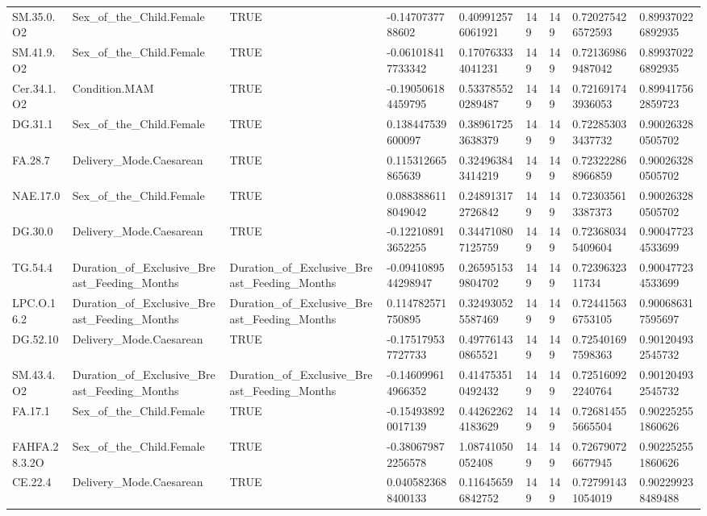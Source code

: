\begin{longtable}{lllllllll}
SM.35.0.O2 & Sex\_of\_the\_Child.Female & TRUE & -0.1470737788602 & 0.409912576061921 & 149 & 149 & 0.720275426572593 & 0.899370226892935 \\
SM.41.9.O2 & Sex\_of\_the\_Child.Female & TRUE & -0.061018417733342 & 0.170763334041231 & 149 & 149 & 0.721369869487042 & 0.899370226892935 \\
Cer.34.1.O2 & Condition.MAM & TRUE & -0.190506184459795 & 0.533785520289487 & 149 & 149 & 0.721691743936053 & 0.899417562859723 \\
DG.31.1 & Sex\_of\_the\_Child.Female & TRUE & 0.138447539600097 & 0.389617253638379 & 149 & 149 & 0.722853033437732 & 0.900263280505702 \\
FA.28.7 & Delivery\_Mode.Caesarean & TRUE & 0.115312665865639 & 0.324963843414219 & 149 & 149 & 0.723222868966859 & 0.900263280505702 \\
NAE.17.0 & Sex\_of\_the\_Child.Female & TRUE & 0.0883886118049042 & 0.248913172726842 & 149 & 149 & 0.723035613387373 & 0.900263280505702 \\
DG.30.0 & Delivery\_Mode.Caesarean & TRUE & -0.122108913652255 & 0.344710807125759 & 149 & 149 & 0.723680345409604 & 0.900477234533699 \\
TG.54.4 & Duration\_of\_Exclusive\_Breast\_Feeding\_Months & Duration\_of\_Exclusive\_Breast\_Feeding\_Months & -0.0941089544298947 & 0.265951539804702 & 149 & 149 & 0.7239632311734 & 0.900477234533699 \\
LPC.O.16.2 & Duration\_of\_Exclusive\_Breast\_Feeding\_Months & Duration\_of\_Exclusive\_Breast\_Feeding\_Months & 0.114782571750895 & 0.324930525587469 & 149 & 149 & 0.724415636753105 & 0.900686317595697 \\
DG.52.10 & Delivery\_Mode.Caesarean & TRUE & -0.175179537727733 & 0.497761430865521 & 149 & 149 & 0.725401697598363 & 0.901204932545732 \\
SM.43.4.O2 & Duration\_of\_Exclusive\_Breast\_Feeding\_Months & Duration\_of\_Exclusive\_Breast\_Feeding\_Months & -0.146099614966352 & 0.414753510492432 & 149 & 149 & 0.725160922240764 & 0.901204932545732 \\
FA.17.1 & Sex\_of\_the\_Child.Female & TRUE & -0.154938920017139 & 0.442622624183629 & 149 & 149 & 0.726814555665504 & 0.902252551860626 \\
FAHFA.28.3.2O & Sex\_of\_the\_Child.Female & TRUE & -0.380679872256578 & 1.08741050052408 & 149 & 149 & 0.726790726677945 & 0.902252551860626 \\
CE.22.4 & Delivery\_Mode.Caesarean & TRUE & 0.0405823688400133 & 0.116456596842752 & 149 & 149 & 0.727991431054019 & 0.902299238489488 \\

\end{longtable}
